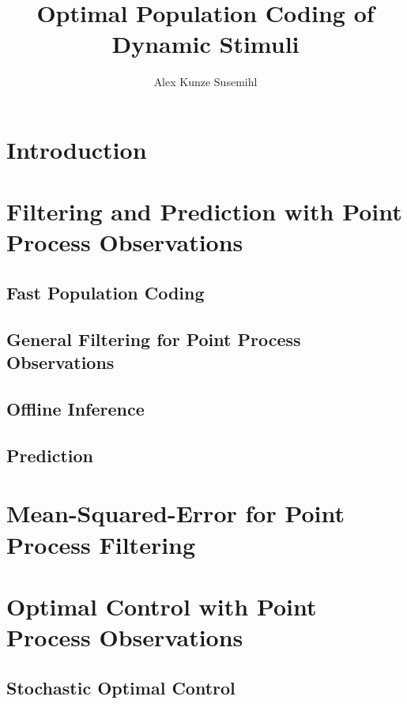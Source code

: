 \documentclass[justified,notitlepage]{tufte-book}   	%
\title{Optimal Population Coding of Dynamic Stimuli}
\author{Alex Kunze Susemihl}
\begin{document}
\maketitle
\setcounter{secnumdepth}{1}
\tableofcontents
\chapter{Introduction}



\chapter{Filtering and Prediction with Point Process Observations}

\label{chap:filtering}

\section{Fast Population Coding}

\section{General Filtering for Point Process Observations}


\section{Offline Inference}

\section{Prediction}

\chapter{Mean-Squared-Error for Point Process Filtering}

\label{chap:MSE}

\chapter{Optimal Control with Point Process Observations}

\label{chap:control}

\section{Stochastic Optimal Control}
\end{document}
